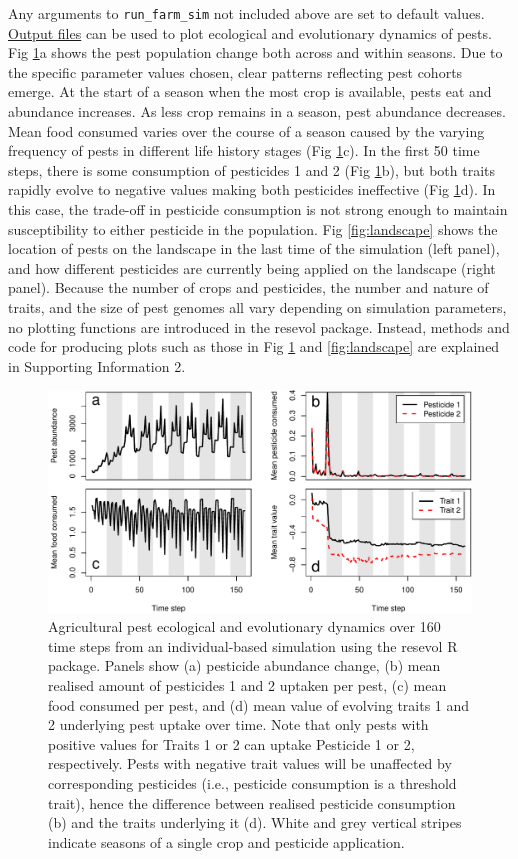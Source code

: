 \documentclass[
]{article}
\begin{document}
Any arguments to \texttt{run\_farm\_sim} not included above are set to default values.
\protect\hyperlink{output}{Output files} can be used to plot ecological and evolutionary dynamics of pests.
Fig \ref{fig:overtime}a shows the pest population change both across and within seasons.
Due to the specific parameter values chosen, clear patterns reflecting pest cohorts emerge.
At the start of a season when the most crop is available, pests eat and abundance increases.
As less crop remains in a season, pest abundance decreases.
Mean food consumed varies over the course of a season caused by the varying frequency of pests in different life history stages (Fig \ref{fig:overtime}c).
In the first 50 time steps, there is some consumption of pesticides 1 and 2 (Fig \ref{fig:overtime}b), but both traits rapidly evolve to negative values making both pesticides ineffective (Fig \ref{fig:overtime}d).
In this case, the trade-off in pesticide consumption is not strong enough to maintain susceptibility to either pesticide in the population.
Fig \ref{fig:landscape} shows the location of pests on the landscape in the last time of the simulation (left panel), and how different pesticides are currently being applied on the landscape (right panel).
Because the number of crops and pesticides, the number and nature of traits, and the size of pest genomes all vary depending on simulation parameters, no plotting functions are introduced in the resevol package.
Instead, methods and code for producing plots such as those in Fig \ref{fig:overtime} and \ref{fig:landscape} are explained in Supporting Information 2.

\begin{figure}
\centering
\includegraphics{ms_files/figure-latex/overtime-1.pdf}
\caption{\label{fig:overtime}Agricultural pest ecological and evolutionary dynamics over 160 time steps from an individual-based simulation using the resevol R package. Panels show (a) pesticide abundance change, (b) mean realised amount of pesticides 1 and 2 uptaken per pest, (c) mean food consumed per pest, and (d) mean value of evolving traits 1 and 2 underlying pest uptake over time. Note that only pests with positive values for Traits 1 or 2 can uptake Pesticide 1 or 2, respectively. Pests with negative trait values will be unaffected by corresponding pesticides (i.e., pesticide consumption is a threshold trait), hence the difference between realised pesticide consumption (b) and the traits underlying it (d). White and grey vertical stripes indicate seasons of a single crop and pesticide application.}
\end{figure}
\end{document}
